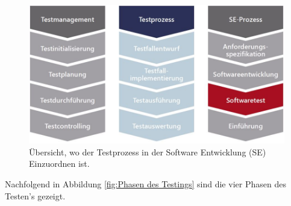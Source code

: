 \begin{figure}[H]
	\centering
	\includegraphics[width=0.7\columnwidth]{02/bilder/Einordnung Testprozess.JPG}
	\caption{Übersicht, wo der Testprozess in der Software Entwicklung (SE) Einzuordnen ist.}
	\label{fig:Einordnung Testprozess}
\end{figure}

Nachfolgend in Abbildung \ref{fig:Phasen des Testings} sind die vier Phasen des Testen's gezeigt.

